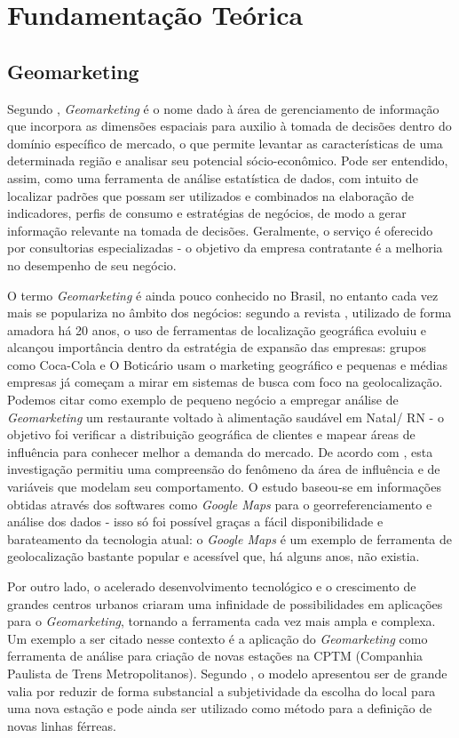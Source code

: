 
\chapter{Fundamentação Teórica} \label{fundamentacao-teorica}

\section{Geomarketing}
\label{Geom}
Segundo , \emph{Geomarketing} é o nome dado à área de
gerenciamento de informação que incorpora as dimensões espaciais para auxilio à
tomada de decisões dentro do domínio específico de mercado, o que permite
levantar as características de uma determinada região e analisar seu potencial
sócio-econômico. Pode ser entendido, assim, como uma ferramenta de análise
estatística de dados, com intuito de localizar padrões que possam ser utilizados
e combinados na elaboração de indicadores, perfis de consumo e estratégias de
negócios, de modo a gerar informação relevante na tomada de decisões.
Geralmente, o serviço é oferecido por consultorias especializadas - o  objetivo
da empresa  contratante é a melhoria no desempenho de seu negócio.

O termo \emph{Geomarketing} é ainda pouco conhecido no Brasil, no entanto cada
vez mais se populariza no âmbito dos negócios: segundo a revista
, utilizado de forma amadora há 20 anos, o uso de ferramentas
de localização geográfica evoluiu e alcançou importância dentro da estratégia de
expansão das empresas: grupos como Coca-Cola e O Boticário usam o marketing
geográfico e pequenas e médias empresas já começam a mirar em sistemas de busca
com foco na geolocalização. Podemos citar como exemplo de pequeno negócio a
empregar análise de \emph{Geomarketing} um restaurante voltado à alimentação saudável
em Natal/ RN - o objetivo foi verificar a distribuição geográfica de clientes e
mapear áreas de influência para conhecer melhor a demanda do mercado. De acordo
com , esta investigação permitiu uma compreensão do
fenômeno da área de influência e de variáveis que modelam seu comportamento. O
estudo baseou-se em informações obtidas através dos softwares como \emph{Google
Maps} para o georreferenciamento e análise dos dados - isso só foi possível
graças a fácil disponibilidade e barateamento da tecnologia atual: o
\emph{Google Maps} é um exemplo de ferramenta de geolocalização bastante popular
e acessível que, há alguns anos, não existia.

Por outro lado, o acelerado desenvolvimento tecnológico e o crescimento de
grandes centros urbanos criaram uma infinidade de possibilidades em aplicações
para o \emph{Geomarketing}, tornando a ferramenta cada vez mais ampla e
complexa. Um exemplo a ser citado nesse contexto é a aplicação do
\emph{Geomarketing} como ferramenta de análise para criação de novas estações na
CPTM (Companhia Paulista de Trens Metropolitanos). Segundo
, o modelo apresentou ser de grande valia por reduzir de
forma substancial a subjetividade da escolha do local para uma nova estação e
pode ainda ser utilizado como método para a definição de novas linhas férreas.

